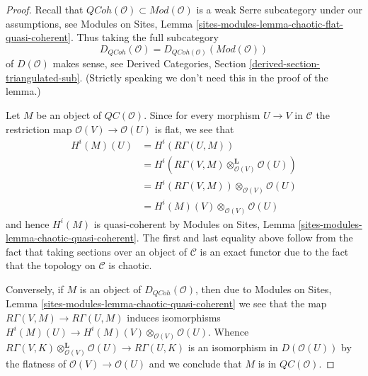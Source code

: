 \documentclass[10pt,a4paper]{amsart}
\theoremstyle{plain}
\theoremstyle{definition}
\theoremstyle{remark}
\numberwithin{equation}{subsection}
\def\QCoh{\mathit{QCoh}}
\begin{document}
\begin{proof}
Recall that $\QCoh(\mathcal{O}) \subset \textit{Mod}(\mathcal{O})$
is a weak Serre subcategory under our assumptions, see
Modules on Sites, Lemma \ref{sites-modules-lemma-chaotic-flat-quasi-coherent}.
Thus taking the full subcategory
$$
D_\QCoh(\mathcal{O}) = D_{\QCoh(\mathcal{O})}(\textit{Mod}(\mathcal{O}))
$$
of $D(\mathcal{O})$ makes sense, see Derived Categories, Section
\ref{derived-section-triangulated-sub}. (Strictly speaking we don't need
this in the proof of the lemma.)

\medskip\noindent
Let $M$ be an object of $\mathit{QC}(\mathcal{O})$. Since for every
morphism $U \to V$ in $\mathcal{C}$ the restriction map
$\mathcal{O}(V) \to \mathcal{O}(U)$ is flat, we see that
\begin{align*}
H^i(M)(U)
& =
H^i(R\Gamma(U, M)) \\
& =
H^i(R\Gamma(V, M) \otimes_{\mathcal{O}(V)}^\mathbf{L} \mathcal{O}(U)) \\
& =
H^i(R\Gamma(V, M)) \otimes_{\mathcal{O}(V)} \mathcal{O}(U) \\
& =
H^i(M)(V) \otimes_{\mathcal{O}(V)} \mathcal{O}(U)
\end{align*}
and hence $H^i(M)$ is quasi-coherent by
Modules on Sites, Lemma \ref{sites-modules-lemma-chaotic-quasi-coherent}.
The first and last equality above follow from the fact that
taking sections over an object of $\mathcal{C}$ is an exact functor
due to the fact that the topology on $\mathcal{C}$ is chaotic.

\medskip\noindent
Conversely, if $M$ is an object of $D_\QCoh(\mathcal{O})$, then due to
Modules on Sites, Lemma \ref{sites-modules-lemma-chaotic-quasi-coherent}
we see that the map $R\Gamma(V, M) \to R\Gamma(U, M)$ induces isomorphisms
$H^i(M)(U) \to H^i(M)(V) \otimes_{\mathcal{O}(V)} \mathcal{O}(U)$.
Whence $R\Gamma(V, K) \otimes_{\mathcal{O}(V)}^\mathbf{L} \mathcal{O}(U)
\to R\Gamma(U, K)$ is an isomorphism in $D(\mathcal{O}(U))$ by the flatness
of $\mathcal{O}(V) \to \mathcal{O}(U)$ and we
conclude that $M$ is in $\mathit{QC}(\mathcal{O})$.
\end{proof}
\end{document}
